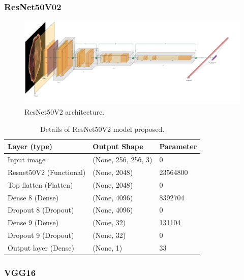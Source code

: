 \documentclass[12pt]{diazessay}
\begin{document}
    \subsubsection{ResNet50V02}
         \begin{figure}[H]
            \centering
            \includegraphics[width=19cm]{Architectures figures/ResNet50.pdf}
            \caption[ResNet50 architecture]{ResNet50V2 architecture.}
        \end{figure}
        \begin{table}[H]
        \begin{center}


        \begin{tabular}{lll}
            \hline
            \textbf{ Layer (type)} & \textbf{Output Shape} & \textbf{Parameter} \\
            \hline
            Input image & (None, 256, 256, 3) & 0 \\
            Resnet50V2 (Functional) & (None, 2048)   & 23564800 \\
            Top flatten (Flatten) & (None, 2048) & 0 \\
            Dense 8 (Dense) & (None, 4096) & 8392704 \\
            Dropout 8 (Dropout) & (None, 4096) & 0 \\
            Dense 9 (Dense)& (None, 32) & 131104\\
            Dropout 9 (Dropout) & (None, 32) & 0\\
            Output layer (Dense)  & (None, 1)  & 33\\
            \hline
        \end{tabular}
        \end{center}
        \caption[Details of ResNet50V2 Model Proposed]{\centering Details of ResNet50V2 model proposed.}
    \end{table}


     
    \subsubsection{VGG16}
    
\end{document}
